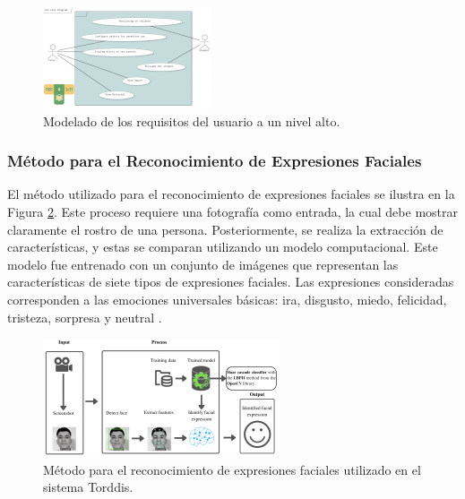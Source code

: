 \documentclass[a4paper,fleqn]{cas-sc}
\begin{document}
		\begin{figure}[h]
			\centering
			\includegraphics[frame,scale=0.5, width=\linewidth]{figs/Figure_2}
			\caption{Modelado de los requisitos del usuario a un nivel alto.\label{fig:UseCaseDiagram}}
		\end{figure} 
		
		\subsubsection{Método para el Reconocimiento de Expresiones Faciales}
		El método utilizado para el reconocimiento de expresiones faciales se ilustra en la Figura \ref{fig:FacialExpression}. Este proceso requiere una fotografía como entrada, la cual debe mostrar claramente el rostro de una persona. Posteriormente, se realiza la extracción de características, y estas se comparan utilizando un modelo computacional. Este modelo fue entrenado con un conjunto de imágenes que representan las características de siete tipos de expresiones faciales. Las expresiones consideradas corresponden a las emociones universales básicas: ira, disgusto, miedo, felicidad, tristeza, sorpresa y neutral \citep{Zhang2022}.
		
		\begin{figure}[h]
			\centering
			\includegraphics[frame,scale=0.5, width=\linewidth]{figs/Figure_3}
			\caption{Método para el reconocimiento de expresiones faciales utilizado en el sistema Torddis.\label{fig:FacialExpression}}
		\end{figure} 
		
\end{document}
